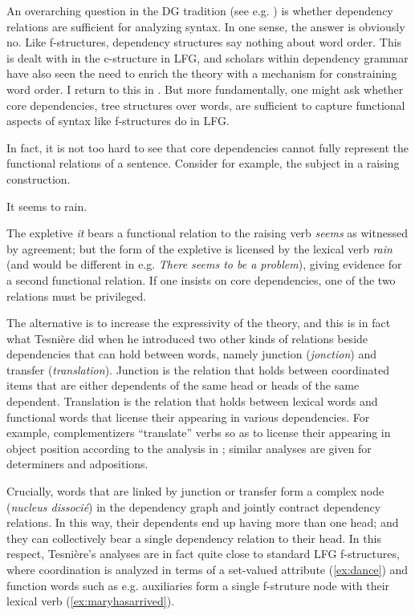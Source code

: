 \documentclass[output=paper,hidelinks]{langscibook}
\begin{document}
An overarching question in the DG tradition (see e.g. 
\citealt[199f.]{deMarneffeNivre2019}) is whether dependency relations
are sufficient for analyzing syntax. In one sense, the answer is
obviously no. Like f-structures, dependency structures say nothing
about word order. This is dealt with in the c-structure in LFG, and
scholars within dependency grammar have also seen the need to enrich
the theory with a mechanism for constraining word order. I return to
this in . But more fundamentally, one
might ask whether core dependencies, tree structures over words, are
sufficient to capture functional aspects of syntax like f-structures
do in LFG.

In fact, it is not too hard to see that core dependencies cannot fully
represent the functional relations of a sentence. Consider for example, the
subject in a raising construction.

\begin{exe}
  \ex
    It seems to rain.
\end{exe}
%
The expletive \textit{it} bears a functional relation to the raising
verb \textit{seems} as witnessed by agreement; but the form of the expletive is
licensed by the lexical verb \textit{rain} (and would be different in
e.g. \textit{There seems to be a problem}), giving evidence for a
second functional relation. If one insists on core dependencies, one
of the two relations must be privileged.

The alternative is to increase the expressivity of the theory, and
this is in fact what Tesnière did when he introduced two other kinds of
relations beside dependencies that can hold between words, namely
junction (\emph{jonction}) and transfer (\emph{translation}). Junction
is the relation that holds between coordinated items that are either
dependents of the same head or heads of the same
dependent. Translation is the relation that holds between lexical
words and functional words that license their appearing in various
dependencies. For example, complementizers ``translate'' verbs so as
to license their appearing in object position according to the
analysis in \citet[24]{Tesniere1959}; similar analyses are given for
determiners and adpositions.

Crucially, words that are linked by
junction or transfer form a complex node (\textit{nucleus dissocié})
in the dependency graph and jointly contract dependency relations. In
this way, their dependents end up having more than one head; and
they can collectively bear a single dependency relation to their
head. In this respect, Tesnière's analyses are in fact quite close to
standard LFG f-structures, where coordination is analyzed in terms of
a set-valued attribute (\ref{ex:dance}) and function words such as
e.g. auxiliaries form a single f-struture node with their lexical verb
(\ref{ex:maryhasarrived}).
\end{document}
